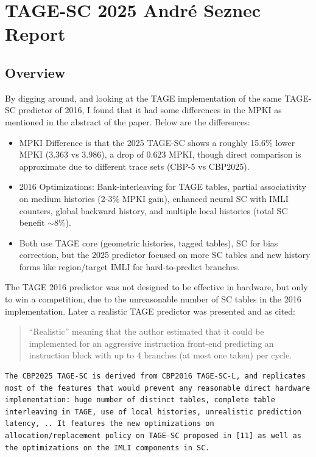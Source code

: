 \documentclass[11pt,a4paper]{article}
\begin{document}
\newpage

\section{TAGE-SC 2025 André Seznec Report}

\subsection{Overview}

By digging around, and looking at the TAGE implementation of the same TAGE-SC predictor of 2016, I found that it had some differences in the MPKI as mentioned in the abstract of the paper. Below are the differences:

\begin{itemize}
    \item MPKI Difference is that the 2025 TAGE-SC shows a roughly 15.6\% lower MPKI (3.363 vs 3.986), a drop of 0.623 MPKI, though direct comparison is approximate due to different trace sets (CBP-5 vs CBP2025).
    \item 2016 Optimizations: Bank-interleaving for TAGE tables, partial associativity on medium histories (2-3\% MPKI gain), enhanced neural SC with IMLI counters, global backward history, and multiple local histories (total SC benefit $\sim$8\%).
    \item Both use TAGE core (geometric histories, tagged tables), SC for bias correction, but the 2025 predictor focused on more SC tables and new history forms like region/target IMLI for hard-to-predict branches.
\end{itemize}

The TAGE 2016 predictor was not designed to be effective in hardware, but only to win a competition, due to the unreasonable number of SC tables in the 2016 implementation. Later a realistic TAGE predictor was presented and as cited:

\begin{quote}
``Realistic'' meaning that the author estimated that it could be implemented for an aggressive instruction front-end predicting an instruction block with up to 4 branches (at most one taken) per cycle.
\end{quote}

\begin{lstlisting}[breaklines=true]
The CBP2025 TAGE-SC is derived from CBP2016 TAGE-SC-L, and replicates most of the features that would prevent any reasonable direct hardware implementation: huge number of distinct tables, complete table interleaving in TAGE, use of local histories, unrealistic prediction latency, .. It features the new optimizations on allocation/replacement policy on TAGE-SC proposed in [11] as well as the optimizations on the IMLI components in SC.
\end{lstlisting}
\end{document}
